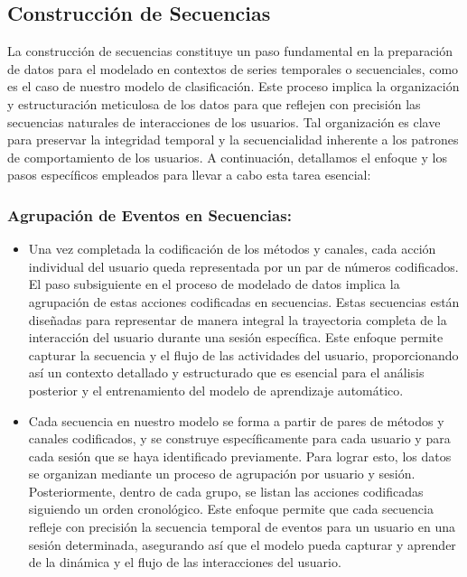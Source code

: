 \subsection{Construcción de Secuencias}

La construcción de secuencias constituye un paso fundamental en la preparación de datos para el modelado en contextos de series temporales o secuenciales, como es el caso de nuestro modelo de clasificación. Este proceso implica la organización y estructuración meticulosa de los datos para que reflejen con precisión las secuencias naturales de interacciones de los usuarios. Tal organización es clave para preservar la integridad temporal y la secuencialidad inherente a los patrones de comportamiento de los usuarios. A continuación, detallamos el enfoque y los pasos específicos empleados para llevar a cabo esta tarea esencial:

\subsubsection{Agrupación de Eventos en Secuencias:}

\begin{itemize}
    \item Una vez completada la codificación de los métodos y canales, cada acción individual del usuario queda representada por un par de números codificados. El paso subsiguiente en el proceso de modelado de datos implica la agrupación de estas acciones codificadas en secuencias. Estas secuencias están diseñadas para representar de manera integral la trayectoria completa de la interacción del usuario durante una sesión específica. Este enfoque permite capturar la secuencia y el flujo de las actividades del usuario, proporcionando así un contexto detallado y estructurado que es esencial para el análisis posterior y el entrenamiento del modelo de aprendizaje automático.
    \item Cada secuencia en nuestro modelo se forma a partir de pares de métodos y canales codificados, y se construye específicamente para cada usuario y para cada sesión que se haya identificado previamente. Para lograr esto, los datos se organizan mediante un proceso de agrupación por usuario y sesión. Posteriormente, dentro de cada grupo, se listan las acciones codificadas siguiendo un orden cronológico. Este enfoque permite que cada secuencia refleje con precisión la secuencia temporal de eventos para un usuario en una sesión determinada, asegurando así que el modelo pueda capturar y aprender de la dinámica y el flujo de las interacciones del usuario.
\end{itemize}

